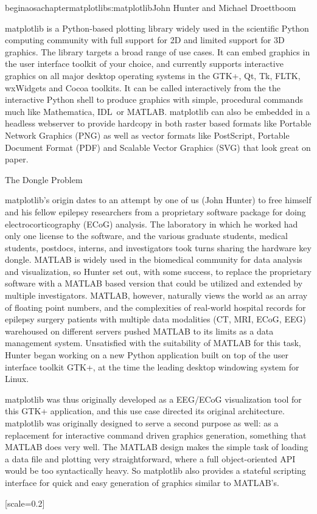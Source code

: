 begin{aosachapter}{matplotlib}{s:matplotlib}{John Hunter and Michael Droettboom}

matplotlib is a Python-based plotting library widely used in
the scientific Python computing community with full support for 2D and
limited support for 3D graphics.  The library targets a broad range of
use cases.  It can embed graphics in the user interface toolkit of
your choice, and currently supports interactive graphics on all major
desktop operating systems in the GTK+, Qt, Tk, FLTK, wxWidgets and
Cocoa toolkits.  It can be called interactively from the the
interactive Python shell to produce graphics with simple, procedural
commands much like Mathematica\texttrademark, IDL\texttrademark\ or
MATLAB\texttrademark.  matplotlib can also be embedded in a headless
webserver to provide hardcopy in both raster based formats like
Portable Network Graphics (PNG) as well as vector formats like
PostScript, Portable Document Format (PDF) and Scalable Vector
Graphics (SVG) that look great on paper.

\begin{aosasect1}{The Dongle Problem}

matplotlib's origin dates to an attempt by one of us (John Hunter) to
free himself and his fellow epilepsy researchers from a proprietary
software package for doing electrocorticography (ECoG) analysis.  The
laboratory in which he worked had only one license to the software,
and the various graduate students, medical students, postdocs, interns,
and investigators took turns sharing the hardware key dongle.
MATLAB is widely used in the biomedical community for
data analysis and visualization, so Hunter set out, with some success,
to replace the proprietary software with a MATLAB based version that
could be utilized and extended by multiple investigators.  MATLAB,
however, naturally views the world as an array of floating point
numbers, and the complexities of real-world hospital records for
epilepsy surgery patients with multiple data modalities (CT, MRI,
ECoG, EEG) warehoused on different servers pushed MATLAB to its limits
as a data management system.  Unsatisfied with the suitability of
MATLAB for this task, Hunter began working on a new Python application
built on top of the user interface toolkit GTK+, at the time the
leading desktop windowing system for Linux.

matplotlib was thus originally developed as a EEG/ECoG visualization
tool for this GTK+ application, and this use case directed its
original architecture.  matplotlib was originally designed to serve a
second purpose as well: as a replacement for interactive command
driven graphics generation, something that MATLAB does very well.  The
MATLAB design makes the simple task of loading a data file and
plotting very straightforward, where a full object-oriented API would
be too syntactically heavy.  So matplotlib also provides a stateful
scripting interface for quick and easy generation of graphics similar
to MATLAB's.

[scale=0.2]
\end{aosasect1}

